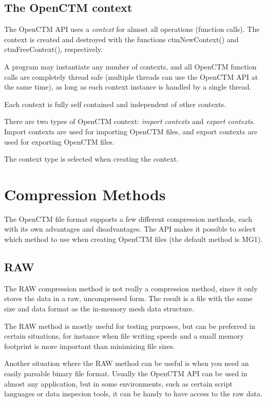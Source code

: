 \section{The OpenCTM context}
The OpenCTM API uses a \emph{context} for almost all operations (function calls).
The context is created and destroyed with the functions ctmNewContext() and
ctmFreeContext(), respectively.

A program may instantiate any number of contexts, and all OpenCTM function
calls are completely thread safe (multiple threads can use the OpenCTM API
at the same time), as long as each context instance is handled by a single
thread.

Each context is fully self contained and independent of other contexts.

There are two types of OpenCTM context: \emph{import contexts} and
\emph{export contexts}. Import contexts are used for importing OpenCTM files,
and export contexts are used for exporting OpenCTM files.

The context type is selected when creating the context.




\chapter{Compression Methods}
The OpenCTM file format supports a few different compression methods, each
with its own advantages and disadvantages. The API makes it possible to
select which method to use when creating OpenCTM files (the default method
is MG1).


\section{RAW}
The RAW compression method is not really a compression method, since it only
stores the data in a raw, uncompressed form. The result is a file with the same
size and data format as the in-memory mesh data structure.

The RAW method is mostly useful for testing purposes, but can be preferred in
certain situations, for instance when file writing speeds and a small memory
footprint is more important than minimizing file sizes.

Another situation where the RAW method can be useful is when you need an
easily parsable binary file format. Usually the OpenCTM API can be used in
almost any application, but in some environments, such as certain script
languages or data inspecion tools, it can be handy to have access to the
raw data.


